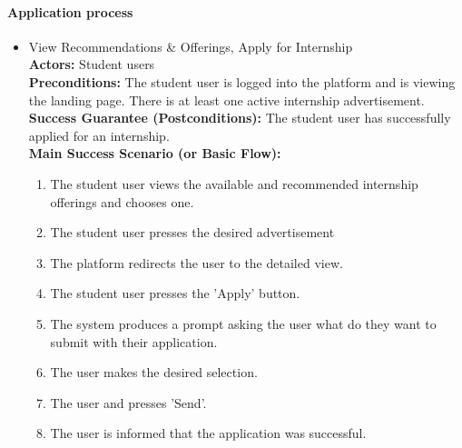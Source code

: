 \paragraph{Application process}

\begin{itemize}[label={[\textbf{UC}]}, align=left, leftmargin=*]
    \item {} View Recommendations \& Offerings, Apply for Internship \\
     \textbf{Actors:} Student users\\
     \textbf{Preconditions:} The student user is logged into the platform and is viewing the landing page. There is at least one active internship advertisement.\\
     \textbf{Success Guarantee (Postconditions):} The student user has successfully applied for an internship. \\
     \textbf{Main Success Scenario (or Basic Flow):} 
     \begin{enumerate}[label=\arabic*.] 
        \item The student user views the available and recommended internship offerings and chooses one.
        \item The student user presses the desired advertisement 
        \item The platform redirects the user to the detailed view.
        \item The student user presses the 'Apply' button.
        \item The system produces a prompt asking the user what do they want to submit with their application.
        \item The user makes the desired selection.
        \item The user and presses 'Send'.
        \item The user is informed that the application was successful.
     \end{enumerate} \\


\end{itemize}
